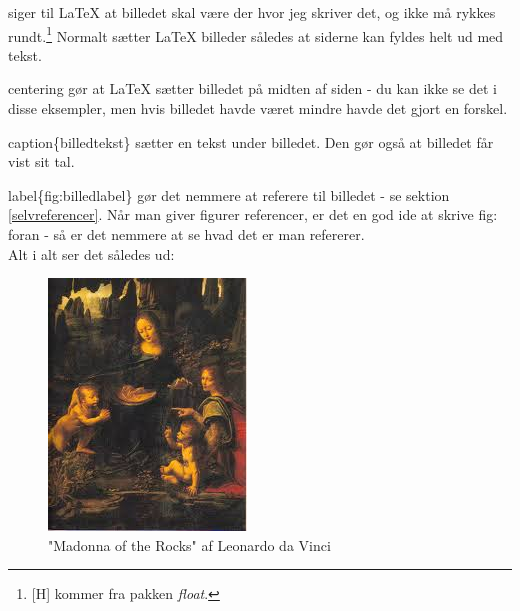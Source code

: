 \noindent
[H] siger til LaTeX at billedet skal være der hvor jeg skriver det, og ikke må rykkes rundt.\footnote{[H] kommer fra pakken \emph{float}.} Normalt sætter LaTeX billeder således at siderne kan fyldes helt ud med tekst.

\noindent
\bs centering gør at LaTeX sætter billedet på midten af siden - du kan ikke se det i disse eksempler, men hvis billedet havde været mindre havde det gjort en forskel.

\noindent
\bs caption\{billedtekst\} sætter en tekst under billedet. Den gør også at billedet får vist sit tal.

\noindent
\bs label\{fig:billedlabel\} gør det nemmere at referere til billedet - se sektion  \ref{selvreferencer}. Når man giver figurer referencer, er det en god ide at skrive fig: foran - så er det nemmere at se hvad det er man refererer.\\

\noindent
Alt i alt ser det således ud:

\begin{figure}[H]
\centering
\includegraphics[width=1\linewidth]{billeder/madonna.jpeg}
\caption{"Madonna of the Rocks" af Leonardo da Vinci}
\label{fig:madonna_standard}
\end{figure}


